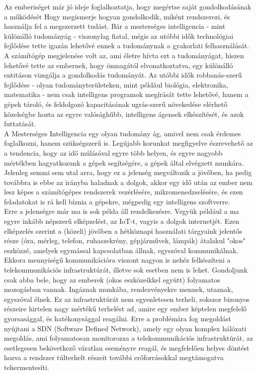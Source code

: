 \label{Chap:bevezetes}


Az emberiséget már jó ideje foglalkoztatja, hogy megértse saját gondolkodásának a működését Hogy megismerje hogyan gondolkodik, miként rendszerezi, és használja fel a megszerzett tudást. Bár a mesterséges intelligencia - mint különálló tudományág - viszonylag fiatal, mégis az utóbbi idők technológiai fejlődése tette igazán lehetővé ennek a tudománynak a gyakorlati felhasználását. \\

A számítógép megjelenése volt az, ami életre hívta ezt a tudományágat, hiszen lehetővé tette az embernek, hogy önmagától elvonatkoztatva, egy különálló entitáson vizsgálja a gondolkodás tudományát. Az utóbbi idők robbanás-szerű fejlődése - olyan tudományterületeken, mint például biológia, elektronika, matematika - nem csak intelligens programok megírását tette lehetővé, hanem a gépek tároló, és feldolgozó kapacitásának ugrás-szerű növekedése elérhető közelségbe hozta az egyre valósághűbb, intelligens ágensek elkészítését, és azok futtatását. \\

A Mesterséges Intelligencia egy olyan tudomány ág, amivel nem csak érdemes foglalkozni, hanem szükségszerű is. Legújabb korunkat megfigyelve észrevehető az a tendencia, hogy az idő múlásával egyre több helyen, és egyre nagyobb mértékben hagyatkozunk a gépek segítségére, a gépek által elvégzett munkára. Jelenleg semmi sem utal arra, hogy ez a jelenség megváltozik a jövőben, ha pedig továbbra is ebbe az irányba haladnak a dolgok, akkor egy idő után az ember nem lesz képes a számítógépes rendszerek vezérlésére, mikromenedzselésére, és ezen feladatokat is rá kell bíznia a gépekre, mégpedig egy intelligens szoftverre. \\

Erre a jelenségre már ma is sok példa áll rendelkezésre. Vegyük például a ma egyre inkább népszerű elképzelést, az IoT-t, vagyis a dolgok internetjét. Ezen elképzelés szerint a (közeli) jövőben a hétköznapi használati tárgyaink jelentős része (óra, mérleg, telefon, ruhaszekrény, gépjárművek, lámpák) átalakul "okos" eszközzé, amelyek egymással kapcsolatban állnak, egyszóval kommunikálnak. Ekkora mennyiségű kommunikációra viszont nagyon is nehéz felkészíteni a telekommunikációs infrastruktúrát, illetve sok esetben nem is lehet. Gondoljunk csak abba bele, hogy az emberek (okos eszközeikkel együtt) folyamatos mozogásban vannak. Ingáznak munkába, rendezvényekre mennek, utaznak, egyszóval élnek. Ez az infrastruktúrát nem egyenletesen terheli, sokszor bizonyos részeire hirtelen nagy mértékű terhelést ad, amire egy ember képtelen megfelelő gyorsasággal, és hatékonysággal reagálni. Erre a problémára fog megoldást nyújtani a SDN (Software Defined Network), amely egy olyan komplex hálózati megoldás, ami folyamatosan monitorozza a telekommunikációs infrastruktúrát, az esetlegesen bekövetkező váratlan eseményre reagál, és megfelelően helyes döntést hozva a rendszer túlterhelt részeit további erőforrásokkal megtámogatva tehermentesíti. \\


